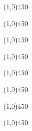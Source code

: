 \documentclass{article}
\begin{document}
\begin{center}
\line(1,0){450}
\end{center}
\vspace*{0.5 cm}
\begin{center}
\line(1,0){450}
\end{center}
\vspace*{0.5 cm}
\begin{center}
\line(1,0){450}
\end{center}
\vspace*{0.5 cm}
\begin{center}
\line(1,0){450}
\end{center}
\vspace*{0.5 cm}
\begin{center}
\line(1,0){450}
\end{center}
\vspace*{0.5 cm}
\begin{center}
\line(1,0){450}
\end{center}
\vspace*{0.5 cm}
\begin{center}
\line(1,0){450}
\end{center}
\vspace*{0.5 cm}
\begin{center}
\line(1,0){450}
\end{center}
\end{document}

